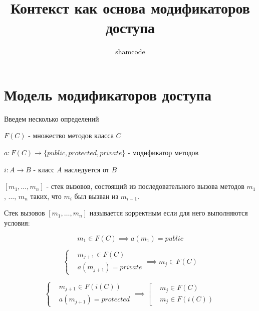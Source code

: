\documentclass[graybox]{svmult}
\begin{document}
\title*{Контекст как основа модификаторов доступа}
\author{shamcode}
\maketitle

\section{Модель модификаторов доступа}
\label{sec:1}
Введем несколько определений
\begin{definition}
$F(C)$ - множество методов класса $C$
\end{definition}

\begin{definition}
$a: F(C) \to \{public, protected, private\}$ - модификатор методов
\end{definition}

\begin{definition}
$i: A \to B$ - класс $A$ наследуется от $B$
\end{definition}

\begin{definition}
$[m_1, \dots, m_n]$ - стек вызовов, состоящий из последовательного вызова методов $m_1$, $\dots$, $m_n$ таких, что $m_i$ был вызван из $m_{i-1}$.
\end{definition}


\begin{definition}
\label{correct_stack}
Стек вызовов  $[m_1, \dots, m_n]$ называется корректным если для него выполняются условия:

\begin{equation}
\label{first_method_public}
m_1 \in F(C) \implies a(m_1) = public
\end{equation}

\begin{equation}
\label{private}
\left\{
\begin{aligned}
&m_{j+1} \in F(C) \\
&a(m_{j+1}) = private
\end{aligned}
\right. 
\implies m_j \in F(C)
\end{equation}

\begin{equation}
\label{protected}
\left\{
	\begin{aligned}
		&m_{j+1} \in F(i(C)) \\
		&a(m_{j+1}) = protected
	\end{aligned}
\right.
\implies
\left[
	\begin{aligned}
		&m_j \in F(C) \\
		&m_j \in F(i(C))
	\end{aligned}
\right.
\end{equation}

\end{definition}
\end{document}
